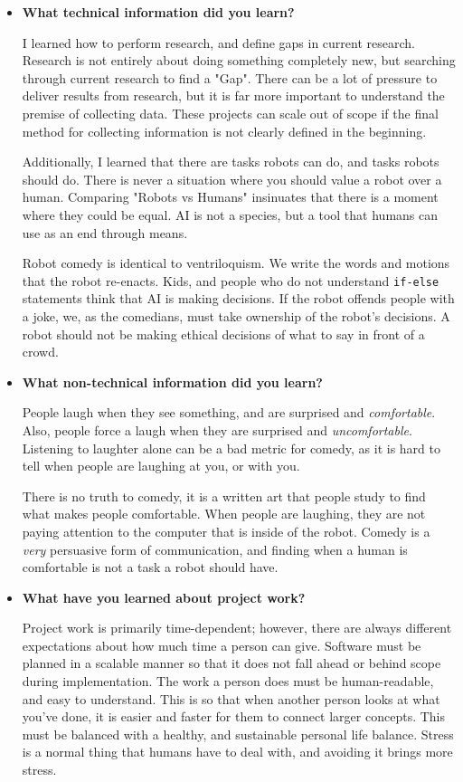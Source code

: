 \documentclass[onecolumn, draftclsnofoot,10pt, compsoc]{IEEEtran}
\begin{document}
\begin{itemize}
\item{\textbf{What technical information did you learn?}}

    I learned how to perform research, and define gaps in current research.
    Research is not entirely about doing something completely new, but searching through current research to find a "Gap".
    There can be a lot of pressure to deliver results from research, but it is far more important to understand the premise of collecting data.
    These projects can scale out of scope if the final method for collecting information is not clearly defined in the beginning.

    Additionally, I learned that there are tasks robots can do, and tasks robots should do.
    There is never a situation where you should value a robot over a human.
    Comparing "Robots vs Humans" insinuates that there is a moment where they could be equal.
    AI is not a species, but a tool that humans can use as an end through means.

    Robot comedy is identical to ventriloquism.
    We write the words and motions that the robot re-enacts.
    Kids, and people who do not understand \texttt{if-else} statements think that AI is making decisions.
    If the robot offends people with a joke, we, as the comedians, must take ownership of the robot's decisions.
    A robot should not be making ethical decisions of what to say in front of a crowd.


\item{\textbf{What non-technical information did you learn?}}


    People laugh when they see something, and are surprised and \textit{comfortable}.
    Also, people force a laugh when they are surprised and \textit{uncomfortable}.
    Listening to laughter alone can be a bad metric for comedy, as it is hard to tell when people are laughing at you, or with you.

    There is no truth to comedy, it is a written art that people study to find what makes people comfortable.
    When people are laughing, they are not paying attention to the computer that is inside of the robot.
    Comedy is a \textit{very} persuasive form of communication, and finding when a human is comfortable is not a task a robot should have.


\item{\textbf{What have you learned about project work?}}

    Project work is primarily time-dependent; however, there are always different expectations about how much time a person can give.
    Software must be planned in a scalable manner so that it does not fall ahead or behind scope during implementation.
    The work a person does must be human-readable, and easy to understand.
    This is so that when another person looks at what you've done, it is easier and faster for them to connect larger concepts.
    This must be balanced with a healthy, and sustainable personal life balance.
    Stress is a normal thing that humans have to deal with, and avoiding it brings more stress.





\end{itemize}
\end{document}
